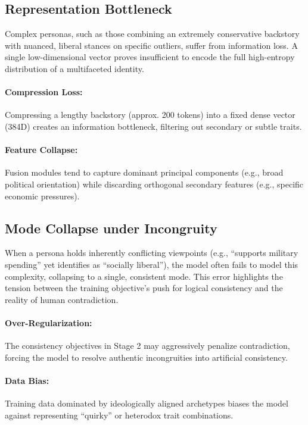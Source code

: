 \subsection{Representation Bottleneck}
Complex personas, such as those combining an extremely conservative backstory with nuanced, liberal stances on specific outliers, suffer from information loss. A single low-dimensional vector proves insufficient to encode the full high-entropy distribution of a multifaceted identity.

\paragraph{\textbf{Compression Loss:}} Compressing a lengthy backstory (approx. 200 tokens) into a fixed dense vector (384D) creates an information bottleneck, filtering out secondary or subtle traits.
\paragraph{\textbf{Feature Collapse:}} Fusion modules tend to capture dominant principal components (e.g., broad political orientation) while discarding orthogonal secondary features (e.g., specific economic pressures).








\subsection{Mode Collapse under Incongruity}
When a persona holds inherently conflicting viewpoints (e.g., ``supports military spending'' yet identifies as ``socially liberal''), the model often fails to model this complexity, collapsing to a single, consistent mode. This error highlights the tension between the training objective's push for logical consistency and the reality of human contradiction.

\paragraph{\textbf{Over-Regularization:}} The consistency objectives in Stage 2 may aggressively penalize contradiction, forcing the model to resolve authentic incongruities into artificial consistency.
\paragraph{\textbf{Data Bias:}} Training data dominated by ideologically aligned archetypes biases the model against representing ``quirky'' or heterodox trait combinations.













